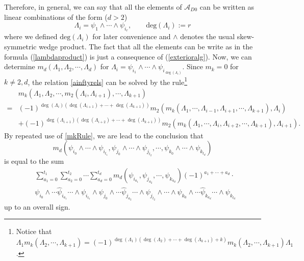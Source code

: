 \documentclass[a4paper,11pt]{article}
\def\cA{\mathcal{A}}
\numberwithin{equation}{section}
\begin{document}
Therefore, in general, we can say that all the elements of $\cA_{D0}$ can be 
written as linear combinations of the form ($d>2$)
\begin{equation}\label{lambdaproduct}
\Lambda_{i}=\psi_{1}\wedge\cdots\wedge\psi_{i_{r}},\qquad 
\mathrm{deg}(\Lambda_{i}):=r
\end{equation}
where we defined $\mathrm{deg}(\Lambda_{i})$ for later convenience and 
$\wedge$ denotes the usual skew-symmetric wedge product. The fact that all the 
elements can be write as in the formula (\ref{lambdaproduct}) is just a 
consequence of (\ref{exterioralg}). Now, we can determine 
$m_d(\Lambda_1,\Lambda_2,\cdots,\Lambda_d)$ for $\Lambda_i = \psi_{i_1} \wedge 
\cdots \wedge \psi_{i_{\deg(\Lambda_i)}}$. Since $m_k = 0$ for $k \neq 
2,d$, the relation \eqref{ainftyrels} can be solved by the 
rule\footnote{Notice that $\Lambda_1 m_k(\Lambda_2,\cdots,\Lambda_{k+1}) = 
(-1)^{\deg(\Lambda_1) (\deg(\Lambda_2)+\cdots+\deg(\Lambda_{k+1})+k)} 
m_k(\Lambda_2,\cdots,\Lambda_{k+1}) \Lambda_1$.}
\begin{equation}\label{mkRule}
\begin{split}
&m_k(\Lambda_1,\Lambda_2,\cdots,m_2(\Lambda_i,\Lambda_{i+1}),\cdots,\Lambda_{k+1
}) \\
= & (-1)^{\deg(\Lambda_i) (\deg(\Lambda_{i+1})+\cdots+\deg(\Lambda_{k+1}) )} 
m_2(m_k(\Lambda_1,\cdots,\Lambda_{i-1},\Lambda_{i+1},\cdots,\Lambda_{k+1}), 
\Lambda_i) \\
&+ (-1)^{\deg(\Lambda_{i+1}) (\deg(\Lambda_{i+2})+\cdots+\deg(\Lambda_{k+1}) )} 
m_2(m_k(\Lambda_1,\cdots,\Lambda_i,\Lambda_{i+2},\cdots,\Lambda_{k+1}), 
\Lambda_{i+1}).
\end{split}
\end{equation}
By repeated use of \eqref{mkRule}, we are lead to the conclusion that
\begin{equation}\label{relsgeneral1}
m_d(\psi_{i_0}\wedge\cdots \wedge \psi_{i_{t_1}},\psi_{j_0}\wedge\cdots \wedge 
\psi_{j_{t_2}},\cdots,\psi_{k_0}\wedge\cdots \wedge \psi_{k_{t_d}})
\end{equation}
is equal to the sum
\begin{equation}\label{relsgeneral2}
\begin{split}
&\sum_{a_1=0}^{t_1} \sum_{a_2=0}^{t_2} \cdots \sum_{a_d=0}^{t_d} 
m_d(\psi_{i_{a_1}},\psi_{j_{a_2}},\cdots,\psi_{k_{a_d}}) (-1)^{a_1+\cdots+a_d} 
\cdot \\
&\psi_{i_0}\wedge \cdots \hat{\psi}_{i_{a_1}} \cdots \wedge \psi_{i_{t_1}} 
\wedge \psi_{j_0}\wedge \cdots  \hat{\psi}_{j_{a_2}} \cdots \wedge 
\psi_{j_{t_2}} \wedge \cdots \wedge \psi_{k_0} \wedge \cdots  
\hat{\psi}_{k_{a_d}} \cdots \wedge \psi_{k_{t_d}} 
\end{split}
\end{equation}
up to an overall sign.
\end{document}
